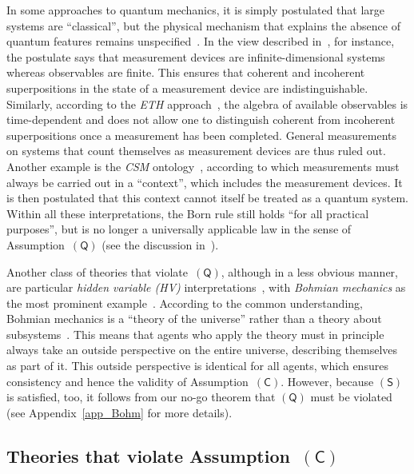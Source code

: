 \documentclass[12pt]{article}
\theoremstyle{mystyle}
\theoremstyle{definition}
\newcommand*{\QT}{\mathsf{(Q)}}
\newcommand*{\SW}{\mathsf{(S)}}
\newcommand*{\SelfCons}{\mathsf{(C)}}
\begin{document}
In some approaches to quantum mechanics, it is simply postulated that large systems are ``classical'', but the physical mechanism that explains the absence of quantum features remains unspecified~\cite{LanLif13}. In the view described in~\cite{Hepp72}, for instance, the postulate says that measurement devices are infinite-dimensional systems whereas observables are finite. This ensures that coherent and incoherent superpositions in the state of a measurement device are indistinguishable. Similarly, according to the  \emph{ETH} approach~\cite{FroSch15}, the algebra of available observables is time-dependent and does not allow one to distinguish coherent from incoherent superpositions once a measurement has been completed. General measurements on systems that count themselves as measurement devices are thus ruled out.  Another example is the \emph{CSM} ontology~\cite{AufGra15}, according to which measurements must always be carried out in a ``context'', which includes the measurement devices. It is then postulated that this context cannot itself be treated as a quantum system. Within all these interpretations, the Born rule still holds ``for all practical purposes'', but is no longer a universally applicable law in the sense of Assumption~$\QT$ (see the discussion in~\cite{Bell75}).

Another class of theories that violate~$\QT$, although in a less obvious manner, are particular \emph{hidden variable (HV)} interpretations~\cite{Neuman32}, with \emph{Bohmian mechanics} as the most prominent example~\cite{deBroglie27,Bohm52,DuTe09}. According to the common understanding, Bohmian mechanics is a ``theory of the universe'' rather than a theory about subsystems~\cite{DuGoZa92}. This means that agents who apply the theory must in principle always take an  outside perspective on the entire universe, describing themselves as part of it. This outside perspective is identical for all agents,  which ensures consistency and hence the validity of Assumption~$\SelfCons$. However, because $\SW$ is satisfied, too, it follows from our no-go theorem that $\QT$ must be violated (see Appendix~\ref{app_Bohm} for more details).   

\smallskip

\subsection{Theories that violate Assumption~$\SelfCons$} \label{sec_Cviolation}
\end{document}

